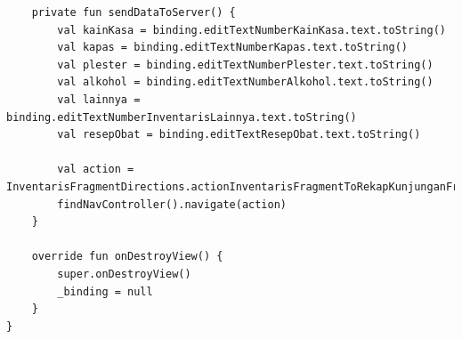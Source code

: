 \begin{enumerate}
\begin{lstlisting}
    private fun sendDataToServer() {
        val kainKasa = binding.editTextNumberKainKasa.text.toString()
        val kapas = binding.editTextNumberKapas.text.toString()
        val plester = binding.editTextNumberPlester.text.toString()
        val alkohol = binding.editTextNumberAlkohol.text.toString()
        val lainnya = binding.editTextNumberInventarisLainnya.text.toString()
        val resepObat = binding.editTextResepObat.text.toString()

        val action = InventarisFragmentDirections.actionInventarisFragmentToRekapKunjunganFragment()
        findNavController().navigate(action)
    }

    override fun onDestroyView() {
        super.onDestroyView()
        _binding = null
    }
}
\end{lstlisting}

\end{enumerate}


